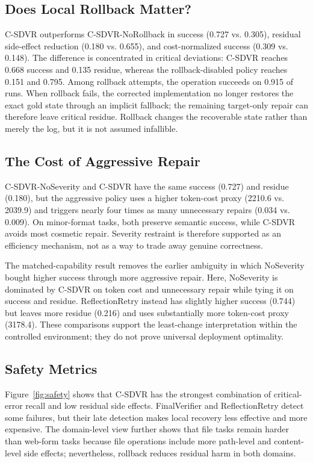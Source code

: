 \documentclass[pdflatex,sn-apa]{sn-jnl}
\begin{document}
\subsection{Does Local Rollback Matter?}

C-SDVR outperforms C-SDVR-NoRollback in success (0.727 vs. 0.305), residual side-effect reduction (0.180 vs. 0.655), and cost-normalized success (0.309 vs. 0.148). The difference is concentrated in critical deviations: C-SDVR reaches 0.668 success and 0.135 residue, whereas the rollback-disabled policy reaches 0.151 and 0.795. Among rollback attempts, the operation succeeds on 0.915 of runs. When rollback fails, the corrected implementation no longer restores the exact gold state through an implicit fallback; the remaining target-only repair can therefore leave critical residue. Rollback changes the recoverable state rather than merely the log, but it is not assumed infallible.

\subsection{The Cost of Aggressive Repair}

C-SDVR-NoSeverity and C-SDVR have the same success (0.727) and residue (0.180), but the aggressive policy uses a higher token-cost proxy (2210.6 vs. 2039.9) and triggers nearly four times as many unnecessary repairs (0.034 vs. 0.009). On minor-format tasks, both preserve semantic success, while C-SDVR avoids most cosmetic repair. Severity restraint is therefore supported as an efficiency mechanism, not as a way to trade away genuine correctness.

The matched-capability result removes the earlier ambiguity in which NoSeverity bought higher success through more aggressive repair. Here, NoSeverity is dominated by C-SDVR on token cost and unnecessary repair while tying it on success and residue. ReflectionRetry instead has slightly higher success (0.744) but leaves more residue (0.216) and uses substantially more token-cost proxy (3178.4). These comparisons support the least-change interpretation within the controlled environment; they do not prove universal deployment optimality.

\subsection{Safety Metrics}

Figure~\ref{fig:safety} shows that C-SDVR has the strongest combination of critical-error recall and low residual side effects. FinalVerifier and ReflectionRetry detect some failures, but their late detection makes local recovery less effective and more expensive. The domain-level view further shows that file tasks remain harder than web-form tasks because file operations include more path-level and content-level side effects; nevertheless, rollback reduces residual harm in both domains.
\end{document}
